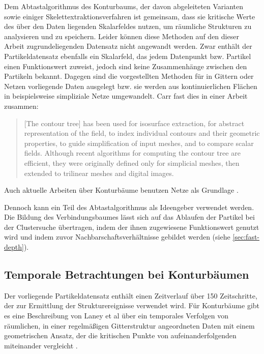 Dem Abtastalgorithmus des Konturbaums, der davon abgeleiteten Varianten sowie einiger Skelettextraktionsverfahren ist gemeinsam, dass sie kritische Werte des über den Daten liegenden Skalarfeldes nutzen, um räumliche Strukturen zu analysieren und zu speichern. Leider können diese Methoden auf den dieser Arbeit zugrundeliegenden Datensatz nicht angewandt werden. Zwar enthält der Partikeldatensatz ebenfalls ein Skalarfeld, das jedem Datenpunkt bzw. Partikel einen Funktionswert zuweist, jedoch sind keine Zusammenhänge zwischen den Partikeln bekannt. Dagegen sind die vorgestellten Methoden für in Gittern oder Netzen vorliegende Daten ausgelegt bzw. sie werden aus kontinuierlichen Flächen in beispielsweise simpliziale Netze umgewandelt. Carr fast dies in einer Arbeit zusammen:
\blockcquote[1]{carr2009representingInterpolantTopology}{[The contour tree] has been used for isosurface extraction, for abstract representation of the field, to index individual contours and their geometric properties, to guide simplification of input meshes, and to compare scalar fields.
Although recent algorithms for computing the contour tree are efficient, they were originally defined only for simplicial meshes, then extended to trilinear meshes and digital images.}
Auch aktuelle Arbeiten über Konturbäume benutzen Netze als Grundlage \cite{raichel2014avoidingGlobalSort} \cite{acharya2015memoryEfficientCT}.

Dennoch kann ein Teil des Abtastalgorithmus als Ideengeber verwendet werden. Die Bildung des Verbindungsbaumes lässt sich auf das Ablaufen der Partikel bei der Clustersuche übertragen, indem der ihnen zugewiesene Funktionswert genutzt wird und indem zuvor Nachbarschaftsverhältnisse gebildet werden (siehe \autoref{sec:fast-depth}).

\subsection*{Temporale Betrachtungen bei Konturbäumen}\label{sec:related:konturbaumTemporal}
Der vorliegende Partikeldatensatz enthält einen Zeitverlauf über 150 Zeitschritte, der zur Ermittlung der Strukturereignisse verwendet wird. Für Konturbäume gibt es eine Beschreibung von Laney et al über ein temporales Verfolgen von räumlichen, in einer regelmäßigen Gitterstruktur angeordneten Daten mit einem geometrischen Ansatz, der die kritischen Punkte von aufeinanderfolgenden  miteinander vergleicht \cite[S.~1056]{laney2006turbulentMixingLayer}.

